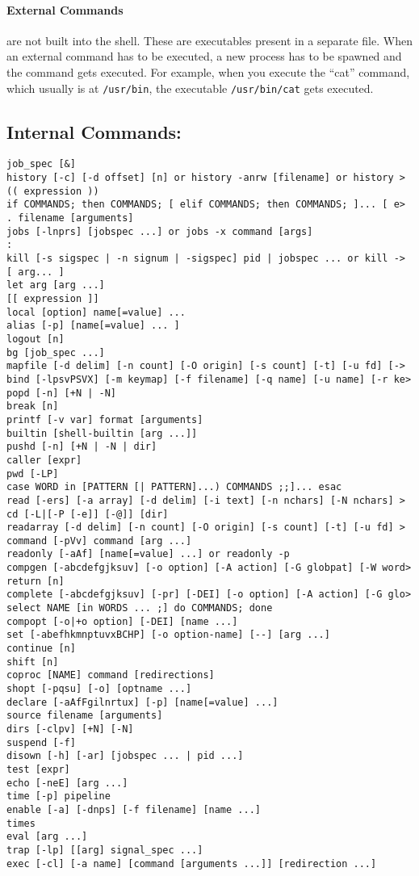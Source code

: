 \documentclass[10pt,a4paper,draft]{article}
\begin{document}
\paragraph{External Commands} are not built into the shell. These are executables present in a separate file. When an external command has to be executed, a new process has to be spawned and the command gets executed. For example, when you execute the ``cat'' command, which usually is at \texttt{/usr/bin}, the executable \texttt{/usr/bin/cat} gets executed.

\subsection{Internal Commands:}
\begin{verbatim}
job_spec [&]
history [-c] [-d offset] [n] or history -anrw [filename] or history >
(( expression ))
if COMMANDS; then COMMANDS; [ elif COMMANDS; then COMMANDS; ]... [ e>
. filename [arguments]
jobs [-lnprs] [jobspec ...] or jobs -x command [args]
:
kill [-s sigspec | -n signum | -sigspec] pid | jobspec ... or kill ->
[ arg... ]
let arg [arg ...]
[[ expression ]]
local [option] name[=value] ...
alias [-p] [name[=value] ... ]
logout [n]
bg [job_spec ...]
mapfile [-d delim] [-n count] [-O origin] [-s count] [-t] [-u fd] [->
bind [-lpsvPSVX] [-m keymap] [-f filename] [-q name] [-u name] [-r ke>
popd [-n] [+N | -N]
break [n]
printf [-v var] format [arguments]
builtin [shell-builtin [arg ...]]
pushd [-n] [+N | -N | dir]
caller [expr]
pwd [-LP]
case WORD in [PATTERN [| PATTERN]...) COMMANDS ;;]... esac
read [-ers] [-a array] [-d delim] [-i text] [-n nchars] [-N nchars] >
cd [-L|[-P [-e]] [-@]] [dir]
readarray [-d delim] [-n count] [-O origin] [-s count] [-t] [-u fd] >
command [-pVv] command [arg ...]
readonly [-aAf] [name[=value] ...] or readonly -p
compgen [-abcdefgjksuv] [-o option] [-A action] [-G globpat] [-W word>
return [n]
complete [-abcdefgjksuv] [-pr] [-DEI] [-o option] [-A action] [-G glo>
select NAME [in WORDS ... ;] do COMMANDS; done
compopt [-o|+o option] [-DEI] [name ...]
set [-abefhkmnptuvxBCHP] [-o option-name] [--] [arg ...]
continue [n]
shift [n]
coproc [NAME] command [redirections]
shopt [-pqsu] [-o] [optname ...]
declare [-aAfFgilnrtux] [-p] [name[=value] ...]
source filename [arguments]
dirs [-clpv] [+N] [-N]
suspend [-f]
disown [-h] [-ar] [jobspec ... | pid ...]
test [expr]
echo [-neE] [arg ...]
time [-p] pipeline
enable [-a] [-dnps] [-f filename] [name ...]
times
eval [arg ...]
trap [-lp] [[arg] signal_spec ...]
exec [-cl] [-a name] [command [arguments ...]] [redirection ...]

\end{verbatim}
\end{document}
